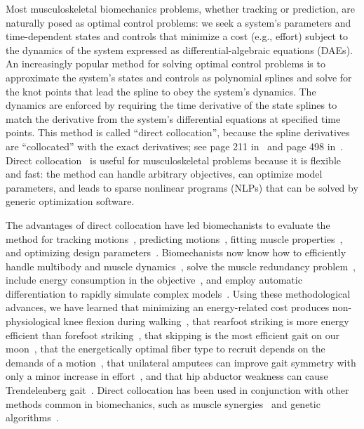 \documentclass[10pt,letterpaper]{article}
\begin{document}
Most musculoskeletal biomechanics problems, whether tracking or prediction, are naturally posed as optimal control problems: we seek a system’s parameters and time-dependent states and controls that minimize a cost (e.g., effort) subject to the dynamics of the system expressed as differential-algebraic equations (DAEs). An increasingly popular method for solving optimal control problems is to approximate the system’s states and controls as polynomial splines and solve for the knot points that lead the spline to obey the system’s dynamics. The dynamics are enforced by requiring the time derivative of the state splines to match the derivative from the system’s differential equations at specified time points. This method is called “direct collocation”, because the spline derivatives are “collocated” with the exact derivatives; see page 211 in~\cite{Hairer:1993} and page 498 in~\cite{Hairer:1996}. Direct collocation~\cite{Betts:2010,Umberger:2018ec,Mombaur:2016eb,Kelly:2017} is useful for musculoskeletal problems because it is flexible and fast: the method can handle arbitrary objectives, can optimize model parameters, and leads to sparse nonlinear programs (NLPs) that can be solved by generic optimization software.

The advantages of direct collocation have led biomechanists to evaluate the method for tracking motions~\cite{Lin:2017jp}, predicting motions~\cite{Porsa:2015dn,Meyer:2016gl,Lee:2016dn,KMoore:2018ea,Lin:2018ex}, fitting muscle properties~\cite{Falisse:2016}, and optimizing design parameters~\cite{Rohani:2017}. Biomechanists now know how to efficiently handle multibody and muscle dynamics~\cite{vandenBogert:2011fv,Groote:2016dq}, solve the muscle redundancy problem~\cite{Groote:2016dq}, include energy consumption in the objective~\cite{Koelewijn:2018kw,Koelewijn:2019}, and employ automatic differentiation to rapidly simulate complex models~\cite{Falisse:2019a}. Using these methodological advances, we have learned that minimizing an energy-related cost produces non-physiological knee flexion during walking~\cite{Ackermann:2010dd}, that rearfoot striking is more energy efficient than forefoot striking~\cite{Miller:2015fc}, that skipping is the most efficient gait on our moon~\cite{Ackermann:2012}, that the energetically optimal fiber type to recruit depends on the demands of a motion~\cite{Lai:2018}, that unilateral amputees can improve gait symmetry with only a minor increase in effort~\cite{Koelewijn:2016bm}, and that hip abductor weakness can cause Trendelenberg gait~\cite{Falisse:2019b}. Direct collocation has been used in conjunction with other methods common in biomechanics, such as muscle synergies~\cite{Mehrabi:2019} and genetic algorithms~\cite{Nguyen:2019}.
\end{document}
